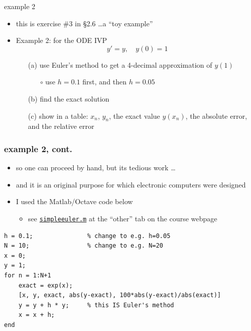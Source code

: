 \documentclass{beamer}
\begin{document}
\begin{frame}{example 2}

\begin{itemize}
\item this is exercise \#3 in \S 2.6 \dots a ``toy example''
\item Example 2:  for the ODE IVP
    $$y'=y, \quad y(0)=1$$

    \begin{itemize}
    \item[(a)] use Euler's method to get a 4-decimal approximation of $y(1)$
        \begin{itemize}
        \item[$\circ$] use $h=0.1$ first, and then $h=0.05$
        \end{itemize}
    \item[(b)] find the exact solution
    \item[(c)] show in a table: $x_n$, $y_n$, the exact value $y(x_n)$, the absolute error, and the relative error
    \end{itemize}
\end{itemize}

\vspace{40mm}
\end{frame}


\begin{frame}[fragile]
\frametitle{example 2, cont.}

\begin{itemize}
\item so one can proceed by hand, but its tedious work \dots
\item and it is an original purpose for which electronic computers were designed
\item I used the Matlab/Octave code below
    \begin{itemize}
    \item see \href{https://bueler.github.io/math302/assets/codes/simpleeuler.m}{\color{cyan} \texttt{simpleeuler.m}} at the ``other'' tab on the course webpage
    \end{itemize}
\end{itemize}

\bigskip
\begin{Verbatim}[fontsize=\footnotesize]
h = 0.1;               % change to e.g. h=0.05
N = 10;                % change to e.g. N=20
x = 0;
y = 1;
for n = 1:N+1
    exact = exp(x);
    [x, y, exact, abs(y-exact), 100*abs(y-exact)/abs(exact)]
    y = y + h * y;     % this IS Euler's method
    x = x + h;
end
\end{Verbatim}
\end{frame}
\end{document}
